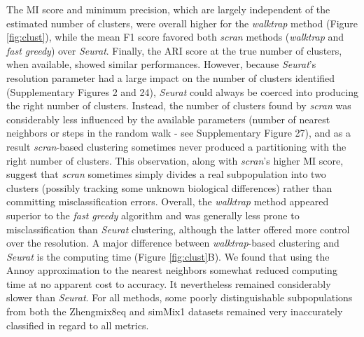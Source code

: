 \documentclass[11pt]{article}
\begin{document}
The MI score and minimum precision, which are largely independent of the estimated number of clusters, were overall higher for the \textit{walktrap} method (Figure \ref{fig:clust}), while the mean F1 score favored both \textit{scran} methods (\textit{walktrap} and \textit{fast greedy}) over \textit{Seurat}. Finally, the ARI score at the true number of clusters, when available, showed similar performances. However, because \textit{Seurat}'s resolution parameter had a large impact on the number of clusters identified (Supplementary Figures 2 and 24), \textit{Seurat} could always be coerced into producing the right number of clusters. Instead, the number of clusters found by \textit{scran} was considerably less influenced by the available parameters (number of nearest neighbors or steps in the random walk - see Supplementary Figure 27), and as a result \textit{scran}-based clustering sometimes never produced a partitioning with the right number of clusters. This observation, along with \textit{scran}'s higher MI score, suggest that \textit{scran} sometimes simply divides a real subpopulation into two clusters (possibly tracking some unknown biological differences) rather than committing misclassification errors. Overall, the \textit{walktrap} method appeared superior to the \textit{fast greedy} algorithm and was generally less prone to misclassification than \textit{Seurat} clustering, although the latter offered more control over the resolution. A major difference between \textit{walktrap}-based clustering and \textit{Seurat} is the computing time (Figure \ref{fig:clust}B). We found that using the Annoy approximation to the nearest neighbors somewhat reduced computing time at no apparent cost to accuracy. It nevertheless remained considerably slower than \textit{Seurat}. For all methods, some poorly distinguishable subpopulations from both the Zhengmix8eq and simMix1 datasets remained very inaccurately classified in regard to all metrics.
\end{document}
